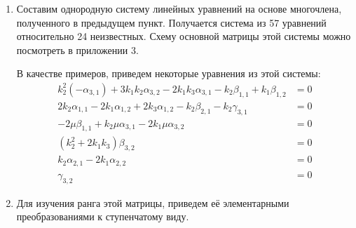\documentclass[../main.tex]{subfiles}
\begin{document}
\begin{enumerate}
\item Составим однородную систему линейных уравнений на основе многочлена, полученного в предыдущем пункт. Получается система из 57 уравнений относительно 24 неизвестных. Схему основной матрицы этой системы можно посмотреть в приложении 3. 

В качестве примеров, приведем некоторые уравнения из этой системы:
\begin{equation}
\begin{aligned}
k_2^2 \left(-\alpha _{3,1}\right)+3 k_1 k_2 \alpha _{3,2}-2 k_1 k_3 \alpha _{3,1}-k_2 \beta _{1,1}+k_1 \beta _{1,2} &= 0 \\
2 k_2 \alpha _{1,1}-2 k_1 \alpha _{1,2}+2 k_3 \alpha _{1,2}-k_2 \beta _{2,1}-k_2 \gamma _{3,1} &=0 \\
-2 \mu  \beta _{1,1}+k_2 \mu  \alpha _{3,1}-2 k_1 \mu  \alpha _{3,2} &= 0 \\
\left(k_2^2 + 2 k_1 k_3\right) \beta _{3,2} &=0 \\ 
k_2 \alpha _{2,1}-2 k_1 \alpha _{2,2} &= 0 \\
\gamma_{3,2} &= 0
\end{aligned}
\end{equation}
\item Для изучения ранга этой матрицы, приведем её элементарными преобразованиями к ступенчатому виду.
\end{enumerate}
\end{document}
